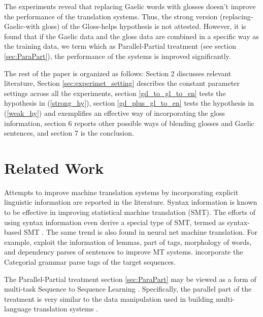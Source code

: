 \documentclass[11pt,a4paper]{article}
\begin{document}
The experiments reveal that replacing Gaelic words with glosses doesn't improve the performance of the translation systems. Thus, the strong version (replacing-Gaelic-with gloss) of the Gloss-helps hypothesis is not attested. However, it is found that if the Gaelic data and the gloss data are combined in a specific way as the training data, we term which as Parallel-Partial treatment (see section \ref{sec:ParaPart}), the performance of the systems is improved significantly. 

The rest of the paper is organized as follows: Section 2 discusses relevant literature, Section \ref{sec:experimet_setting} describes the constant parameter settings across all the experiments, section \ref{gd_to_gl_to_en} tests the hypothesis in (\ref{strong_hy}), section \ref{gd_plus_gl_to_en} tests the hypothesis in (\ref{weak_hy}) and exemplifies an effective way of incorporating the gloss information, section 6 reports other possible ways of blending glosses and Gaelic sentences, and section 7 is the conclusion. 

\section{Related Work}\label{relate_work}
Attempts to improve machine translation systems by incorporating explicit linguistic information are reported in the literature. Syntax information is known to be effective in improving statistical machine translation (SMT). The efforts of using syntax information even derive a special type of SMT, termed as syntax-based SMT \citep{williams2016syntax}. The same trend is also found in neural net machine translation. For example, \citet{sennrich2016linguistic} exploit the information of lemmas, part of tags, morphology of words, and dependency parses of sentences to improve MT systems. \citet{ccg_target_seq} incorporate the Categorial grammar parse tags of the target sequences.

The Parallel-Partial treatment section \ref{sec:ParaPart} may be viewed as a form of multi-task Sequence to Sequence Learning \citep{luong2015multi}. Specifically, the parallel part of the treatment is very similar to the data manipulation used in building multi-language translation systems \citep{google_zero_shot}.  

\end{document}
